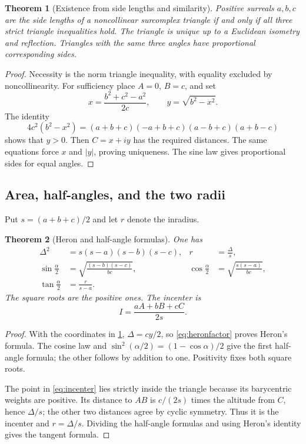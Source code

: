 \documentclass[11pt]{article}
\numberwithin{equation}{section}
\newtheorem{theorem}{Theorem}[section]
\theoremstyle{definition}
\begin{document}
\begin{theorem}[Existence from side lengths and similarity]\label{thm:sss}
Positive surreals $a,b,c$ are the side lengths of a noncollinear surcomplex triangle if and only if all three strict triangle inequalities hold. The triangle is unique up to a Euclidean isometry and reflection. Triangles with the same three angles have proportional corresponding sides.
\end{theorem}
\begin{proof}
Necessity is the norm triangle inequality, with equality excluded by noncollinearity. For sufficiency place $A=0$, $B=c$, and set
\[
 x=\frac{b^2+c^2-a^2}{2c},\qquad y=\sqrt{b^2-x^2}.
\]
The identity
\begin{equation}\label{eq:heronfactor}
 4c^2(b^2-x^2)
 =(a+b+c)(-a+b+c)(a-b+c)(a+b-c)
\end{equation}
shows that $y>0$. Then $C=x+iy$ has the required distances. The same equations force $x$ and $|y|$, proving uniqueness. The sine law gives proportional sides for equal angles.
\end{proof}

\subsection{Area, half-angles, and the two radii}
Put $s=(a+b+c)/2$ and let $r$ denote the inradius.

\begin{theorem}[Heron and half-angle formulas]\label{thm:heron}
One has
\begin{align}
 \Delta^2&=s(s-a)(s-b)(s-c),& r&=\frac\Delta s,\\
 \sin\frac\alpha2&=\sqrt{\frac{(s-b)(s-c)}{bc}},&
 \cos\frac\alpha2&=\sqrt{\frac{s(s-a)}{bc}},\\
 \tan\frac\alpha2&=\frac r{s-a}.
 \label{eq:halfangletriangle}
\end{align}
The square roots are the positive ones. The incenter is
\begin{equation}\label{eq:incenter}
 I=\frac{aA+bB+cC}{2s}.
\end{equation}
\end{theorem}
\begin{proof}
With the coordinates in \cref{thm:sss}, $\Delta=cy/2$, so \eqref{eq:heronfactor} proves Heron's formula. The cosine law and $\sin^2(\alpha/2)=(1-\cos\alpha)/2$ give the first half-angle formula; the other follows by addition to one. Positivity fixes both square roots.

The point in \eqref{eq:incenter} lies strictly inside the triangle because its barycentric weights are positive. Its distance to $AB$ is $c/(2s)$ times the altitude from $C$, hence $\Delta/s$; the other two distances agree by cyclic symmetry. Thus it is the incenter and $r=\Delta/s$. Dividing the half-angle formulas and using Heron's identity gives the tangent formula.
\end{proof}
\end{document}
